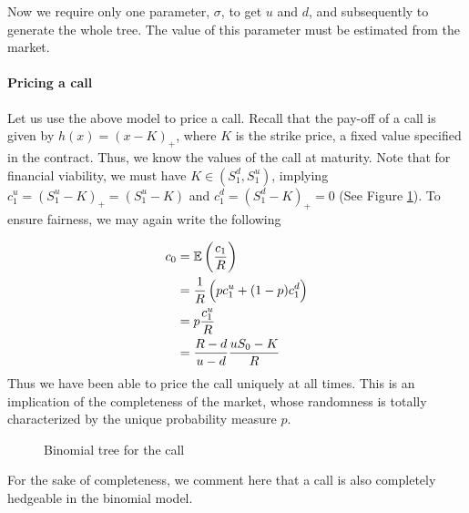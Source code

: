 Now we require only one parameter, $ \sigma $, to get $ u $ and $ d $, and subsequently to generate the whole tree. The value of this parameter must be estimated from the market.


\paragraph{Pricing a call}


Let us use the above model to price a call. Recall that the pay-off of a call is given by $ h(x) = (x - K)_+ $, where $ K $ is the strike price, a fixed value specified in the contract. Thus, we know the values of the call at maturity. Note that for financial viability, we must have $ K \in (S_1^d, S_1^u) $, implying $ c_1^u = (S_1^u - K)_+ = (S_1^u - K) $ and $ c_1^d = (S_1^d - K)_+ = 0 $ (See Figure \ref{fig:discrete-2tr-call}). To ensure fairness, we may again write the following


\begin{align*}
	c_0 &= \operatorname{\mathbb{E}} \left( \frac{c_1}{R} \right) \\
	    &= \frac{1}{R} \left( p c_1^u + (1-p) c_1^d \right) \\
	    &= p \frac{c_1^u}{R} \\
	    &= \frac{R - d}{u - d} \frac{u S_0 - K}{R}
\end{align*}
Thus we have been able to price the call uniquely at all times. This is an implication of the completeness of the market, whose randomness is totally characterized by the unique probability measure $ p $.


\begin{figure}[h]
	
	\caption{Binomial tree for the call}
	\label{fig:discrete-2tr-call}
\end{figure}


For the sake of completeness, we comment here that a call is also completely hedgeable in the binomial model.






